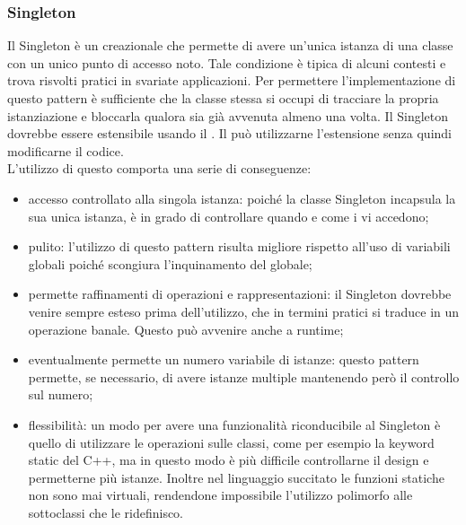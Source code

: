 \documentclass[12pt,a4paper]{article}
\begin{document}
\subsubsection{Singleton}
Il Singleton è un  creazionale che permette di avere un’unica istanza di una classe con un unico punto di accesso noto. Tale condizione è tipica di alcuni contesti e trova risvolti pratici in svariate applicazioni. Per permettere l’implementazione di questo pattern è sufficiente che la classe stessa si occupi di tracciare la propria istanziazione e bloccarla qualora sia già avvenuta almeno una volta. Il Singleton dovrebbe essere estensibile usando il . Il  può utilizzarne l’estensione senza quindi modificarne il codice.\\
L’utilizzo di questo  comporta una serie di conseguenze:
\begin{itemize}
	\item accesso controllato alla singola istanza: poiché la classe Singleton incapsula la sua unica istanza, è in grado di controllare quando e come i  vi accedono;
	\item {} pulito: l’utilizzo di questo pattern risulta migliore rispetto all’uso di variabili globali poiché scongiura l’inquinamento del  globale;
	\item permette raffinamenti di operazioni e rappresentazioni: il Singleton dovrebbe venire sempre esteso prima dell’utilizzo, che in termini pratici si traduce in un operazione banale. Questo può avvenire anche a runtime;
	\item eventualmente permette un numero variabile di istanze: questo pattern permette, se necessario, di avere istanze multiple mantenendo però il controllo sul numero;
	\item flessibilità: un modo per avere una funzionalità riconducibile al Singleton è quello di utilizzare le operazioni sulle classi, come per esempio la keyword static del C++, ma in questo modo è più difficile controllarne il design e permetterne più istanze. Inoltre nel linguaggio succitato le funzioni statiche non sono mai virtuali, rendendone impossibile l’utilizzo polimorfo alle sottoclassi che le ridefinisco.
\end{itemize}

\end{document}
